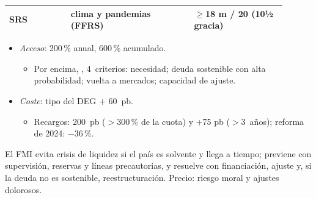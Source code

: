 \documentclass{article}
\begin{document}
\begin{columnas}
{\begin{tabular}{@{}>{\raggedright\arraybackslash}p{0.2\linewidth}>{\raggedright\arraybackslash}p{0.4\linewidth}>{\raggedright\arraybackslash}p{0.3\linewidth}@{}}
SRS & clima y pandemias (FFRS) & $\geq$18 m / 20 (10½ gracia)\\
\bottomrule
\end{tabular}\par}
\begin{itemize}
\item \emph{Acceso}: 200\,\% anual, 600\,\% acumulado.
  \begin{itemize}
  \item Por encima, , 4~criterios: necesidad; deuda sostenible con alta probabilidad; vuelta a mercados; capacidad de ajuste.
  \end{itemize}
\item \emph{Coste}: tipo del DEG + 60~pb.
  \begin{itemize}
  \item Recargos: 200~pb ($>$300\,\% de la cuota) y +75 pb ($>$3~años); reforma de 2024: $-36$\,\%.
  \end{itemize}
\end{itemize}

\begin{ideaclave}
El FMI evita crisis de liquidez si el país es solvente y llega a tiempo; previene con supervisión, reservas y líneas precautorias, y resuelve con financiación, ajuste y, si la deuda no es sostenible, reestructuración. Precio: riesgo moral y ajustes dolorosos.
\end{ideaclave}


\end{columnas}
\end{document}
